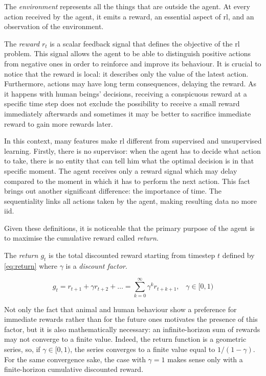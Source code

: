 The \textit{environment} represents all the things that are outside the agent. At every action received by the agent, it emits a reward, an essential aspect of \acrshort{rl}, and an observation of the environment.

The \textit{reward} $r_t$ is a scalar feedback signal that defines the objective of the \acrshort{rl} problem. This signal allows the agent to be able to distinguish positive actions from negative ones in order to reinforce and improve its behaviour. It is crucial to notice that the reward is local: it describes only the value of the latest action. Furthermore, actions may have long term consequences, delaying the reward. As it happens with human beings' decisions, receiving a conspicuous reward at a specific time step does not exclude the possibility to receive a small reward immediately afterwards and sometimes it may be better to sacrifice immediate reward to gain more rewards later.


In this context, many features make \acrshort{rl} different from supervised and unsupervised learning.
Firstly, there is no supervisor: when the agent has to decide what action to take, there is no entity that can tell him what the optimal decision is in that specific moment. The agent receives only a reward signal which may delay compared to the moment in which it has to perform the next action. 
This fact brings out another significant difference: the importance of time. The sequentiality links all actions taken by the agent, making resulting data no more \acrfull{iid}.

Given these definitions, it is noticeable that the primary purpose of the agent is to maximise the cumulative reward called \textit{return}.

The \textit{return $g_t$} is the total discounted reward starting from timestep $t$ defined by \vref{eq:return} where $\gamma$ is a \textit{discount factor}.

\begin{equation} \label{eq:return} 
	g_t = r_{t+1} + \gamma r_{t+2} + \dots = \sum_{k=0}^{\infty} \gamma^k r_{t+k+1}, \;\;\;\gamma \in [0,1)
\end{equation}

 Not only the fact that animal and human behaviour show a preference for immediate rewards rather than for the future ones motivates the presence of this factor, but it is also mathematically necessary: an infinite-horizon sum of rewards may not converge to a finite value. Indeed, the return function is a geometric series, so, if $\gamma \in [0,1)$, the series converges to a finite value equal to $1/(1-\gamma)$. For the same convergence sake, the case with $\gamma = 1$ makes sense only with a finite-horizon cumulative discounted reward.

